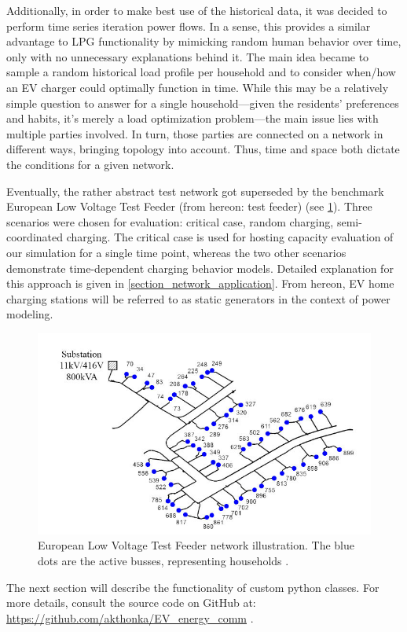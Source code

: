 \documentclass[a4paper,10pt]{report}
\begin{document}
Additionally, in order to make best use of the historical data, it was decided to perform time series iteration power flows. In a sense, this provides a similar advantage to LPG functionality by mimicking random human behavior over time, only with no unnecessary explanations behind it. The main idea became to sample a random historical load profile per household and to consider when/how an EV charger could optimally function in time. While this may be a relatively simple question to answer for a single household---given the residents' preferences and habits, it's merely a load optimization problem---the main issue lies with multiple parties involved. In turn, those parties are connected on a network in different ways, bringing topology into account. Thus, time and space both dictate the conditions for a given network.

Eventually, the rather abstract test network got superseded by the benchmark European Low Voltage Test Feeder (from hereon: test feeder) (see \cref{EU_LV_test_feeder}). Three scenarios were chosen for evaluation: critical case, random charging, semi-coordinated charging. The critical case is used for hosting capacity evaluation of our simulation for a single time point, whereas the two other scenarios demonstrate time-dependent charging behavior models. Detailed explanation for this approach is given in \cref{section_network_application}. From hereon, EV home charging stations will be referred to as static generators in the context of power modeling.

\begin{figure}[htpb]
	\centering
	\includegraphics[width=0.7\linewidth]{EU_LV_test_feeder}
	\caption{European Low Voltage Test Feeder network illustration. The blue dots are the active busses, representing households \cite{Nousdilis2017}.}
	\label{EU_LV_test_feeder}
\end{figure}

The next section will describe the functionality of custom python classes. For more details, consult the source code on GitHub at: \url{https://github.com/akthonka/EV_energy_comm} .
\end{document}
